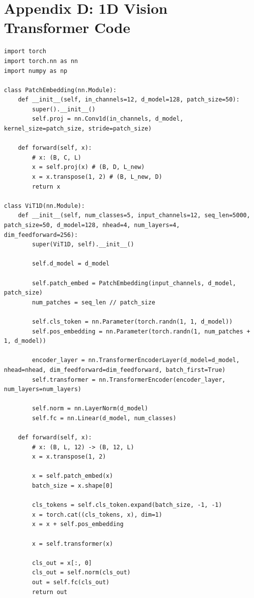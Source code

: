 \documentclass[12pt,a4paper]{report}
\begin{document}
\clearpage

\chapter*{Appendix D: 1D Vision Transformer Code}
\label{app:vit}

\begin{lstlisting}[caption={1D Vision Transformer Architecture (src/models/vit.py)}]
import torch
import torch.nn as nn
import numpy as np

class PatchEmbedding(nn.Module):
    def __init__(self, in_channels=12, d_model=128, patch_size=50):
        super().__init__()
        self.proj = nn.Conv1d(in_channels, d_model, kernel_size=patch_size, stride=patch_size)
        
    def forward(self, x):
        # x: (B, C, L)
        x = self.proj(x) # (B, D, L_new)
        x = x.transpose(1, 2) # (B, L_new, D)
        return x

class ViT1D(nn.Module):
    def __init__(self, num_classes=5, input_channels=12, seq_len=5000, patch_size=50, d_model=128, nhead=4, num_layers=4, dim_feedforward=256):
        super(ViT1D, self).__init__()
        
        self.d_model = d_model
        
        self.patch_embed = PatchEmbedding(input_channels, d_model, patch_size)
        num_patches = seq_len // patch_size
        
        self.cls_token = nn.Parameter(torch.randn(1, 1, d_model))
        self.pos_embedding = nn.Parameter(torch.randn(1, num_patches + 1, d_model))
        
        encoder_layer = nn.TransformerEncoderLayer(d_model=d_model, nhead=nhead, dim_feedforward=dim_feedforward, batch_first=True)
        self.transformer = nn.TransformerEncoder(encoder_layer, num_layers=num_layers)
        
        self.norm = nn.LayerNorm(d_model)
        self.fc = nn.Linear(d_model, num_classes)

    def forward(self, x):
        # x: (B, L, 12) -> (B, 12, L)
        x = x.transpose(1, 2)
        
        x = self.patch_embed(x)
        batch_size = x.shape[0]
        
        cls_tokens = self.cls_token.expand(batch_size, -1, -1)
        x = torch.cat((cls_tokens, x), dim=1)
        x = x + self.pos_embedding
        
        x = self.transformer(x)
        
        cls_out = x[:, 0]
        cls_out = self.norm(cls_out)
        out = self.fc(cls_out)
        return out
\end{lstlisting}
\end{document}
